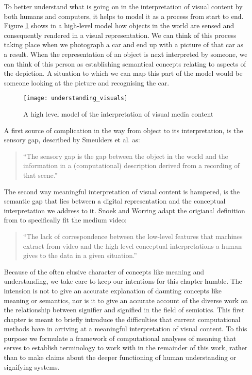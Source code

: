 To better understand what is going on in the interpretation of visual content by both humans and computers, it helps to model it as a process from start to end. Figure \ref{fig:understanding_visuals} shows in a high-level model how objects in the world are sensed and consequently rendered in a visual representation. We can think of this process taking place when we photograph a car and end up with a picture of that car as a result. When the representation of an object is next interpreted by someone, we can think of this person as establishing semantical concepts relating to aspects of the depiction. A situation to which we can map this part of the model would be someone looking at the picture and recognising the car.

\begin{figure}[htbp]
  \centering
    \texttt{[image: understanding\_visuals]}
  \caption{A high level model of the interpretation of visual media content}
  \label{fig:understanding_visuals}
\end{figure}

A first source of complication in the way from object to its interpretation, is the sensory gap, described by Smeulders et al. as:

\begin{quote}
  ``The sensory gap is the gap between the object in the world and the information in a (computational) description derived from a recording of that scene.''\cite{Smeulders:2000tx}
\end{quote}

The second way meaningful interpretation of visual content is hampered, is the semantic gap that lies between a digital representation and the conceptual interpretation we address to it. Snoek and Worring adapt the origianal definition from \cite{Smeulders:2000tx} to specifically fit the medium video:

\begin{quote}
  ``The lack of correspondence between the low-level features that machines extract from video and the high-level conceptual interpretations a human gives to the data in a given situation.''
\end{quote}

Because of the often elusive character of concepts like meaning and understanding, we take care to keep our intentions for this chapter humble. The intension is not to give an accurate explanation of daunting concepts like meaning or semantics, nor is it to give an accurate account of the diverse work on the relationship between signifier and signified in the field of semiotics. This first chapter is meant to briefly introduce the difficulties that current computational methods have in arriving at a meaningful interpretation of visual content. To this purpose we formulate a framework of computational analyses of meaning that serves to establish terminology to work with in the remainder of this work, rather than to make claims about the deeper functioning of human understanding or signifying systems.


